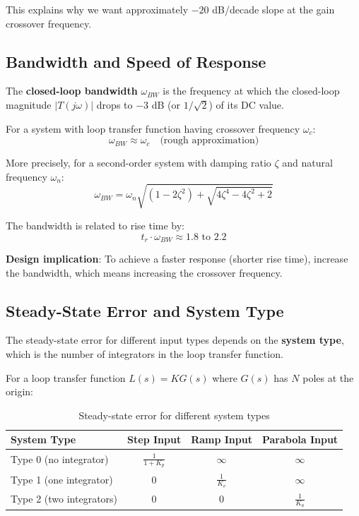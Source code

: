 This explains why we want approximately $-20$ dB/decade slope at the gain crossover frequency.

\subsection{Bandwidth and Speed of Response}
\label{subsec:bandwidth}

The \textbf{closed-loop bandwidth} $\omega_{BW}$ is the frequency at which the closed-loop magnitude $|T(j\omega)|$ drops to $-3$ dB (or $1/\sqrt{2}$) of its DC value.

For a system with loop transfer function having crossover frequency $\omega_c$:
\begin{equation}
\omega_{BW} \approx \omega_c \quad \text{(rough approximation)}
\end{equation}

More precisely, for a second-order system with damping ratio $\zeta$ and natural frequency $\omega_n$:
\begin{equation}
\omega_{BW} = \omega_n \sqrt{(1 - 2\zeta^2) + \sqrt{4\zeta^4 - 4\zeta^2 + 2}}
\end{equation}

The bandwidth is related to rise time by:
\begin{equation}
t_r \cdot \omega_{BW} \approx 1.8 \text{ to } 2.2
\end{equation}

\textbf{Design implication}: To achieve a faster response (shorter rise time), increase the bandwidth, which means increasing the crossover frequency.

\subsection{Steady-State Error and System Type}
\label{subsec:steady_state_error}

The steady-state error for different input types depends on the \textbf{system type}, which is the number of integrators in the loop transfer function.

For a loop transfer function $L(s) = K G(s)$ where $G(s)$ has $N$ poles at the origin:

\begin{table}[htbp]
\centering
\caption{Steady-state error for different system types}
\label{tab:ss_error}
\begin{tabular}{@{}lccc@{}}
\toprule
\textbf{System Type} & \textbf{Step Input} & \textbf{Ramp Input} & \textbf{Parabola Input} \\
\midrule
Type 0 (no integrator) & $\frac{1}{1+K_p}$ & $\infty$ & $\infty$ \\
Type 1 (one integrator) & 0 & $\frac{1}{K_v}$ & $\infty$ \\
Type 2 (two integrators) & 0 & 0 & $\frac{1}{K_a}$ \\
\bottomrule
\end{tabular}
\end{table}

